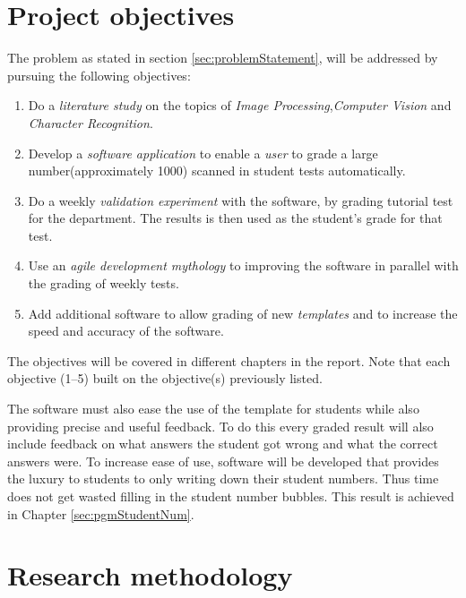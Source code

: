 \section{Project objectives}
\label{sec:Objectives}

The problem as stated in section \ref{sec:problemStatement}, will be addressed by pursuing the following objectives:
\begin{enumerate}
  \item Do a \textsl{literature study} on the topics of \textsl{Image Processing},\textsl{Computer Vision} and \textsl{Character Recognition}.
  \item Develop a \textsl{software application} to enable a \textsl{user} to grade a large number(approximately 1000) scanned in student tests automatically.
  \item Do a weekly \textsl{validation experiment} with the software, by grading tutorial test for the department. The results is then used as the student's grade for that test.
  \item Use an \textsl{agile development mythology} to improving the software in parallel with the grading of weekly tests.
  \item Add additional software to allow grading of new \textsl{templates} and to increase the speed and accuracy of the software.
\end{enumerate}

The objectives will be covered in different chapters in the report. Note that each objective (1--5) built on the objective(s) previously listed.

The software must also ease the use of the template for students while also providing precise and useful feedback. To do this every graded result will also include feedback on what answers the student got wrong and what the correct answers were. To increase ease of use, software will be developed that provides the luxury to students to only writing down their student numbers. Thus time does not get wasted filling in the student number bubbles. This result is achieved in Chapter \ref{sec:pgmStudentNum}.

\section{Research methodology}

